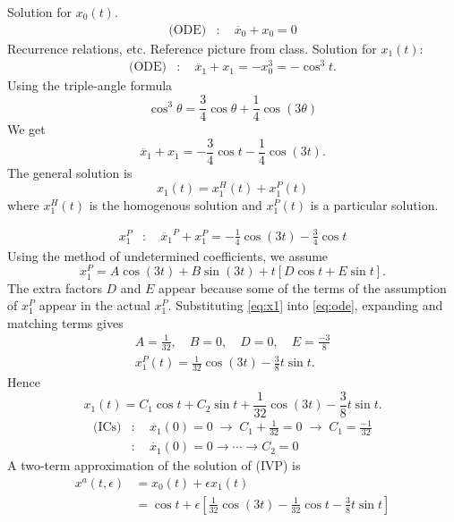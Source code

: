 \documentclass[12pt,twoside]{article}
\begin{document}
Solution for $x_0(t)$.
\begin{align*}
  \text{(ODE)} &:\quad \ddot{x_0}+x_0=0
\end{align*}
Recurrence relations, etc. Reference picture from class. Solution for $x_1(t)$:
\begin{align}
  \label{eq:ode}
  \text{(ODE)} &:\quad \ddot{x_1} + x_1 =-x_0^3=-\cos^3t.
\end{align}
Using the triple-angle formula
$$\cos^3\theta=\frac{3}{4}\cos\theta+\frac{1}{4}\cos(3\theta)$$
We get
$$\ddot{x_1}+x_1=-\frac{3}{4}\cos t-\frac{1}{4}\cos(3t).$$
The general solution is
$$x_1(t)=x_1^H(t)+x_1^P(t)$$
where $x_1^H(t)$ is the homogenous solution and $x_1^P(t)$ is a particular
solution.

\begin{align}
  \label{eq:x1}
  x_1^P &:\quad \ddot{x_1}^P +x_1^P = -\frac{1}{4}\cos(3t)-\frac{3}{4}\cos t
\end{align}
Using the method of undetermined coefficients, we assume
$$x_1^P=A\cos(3t)+B\sin(3t) + t[D\cos t + E\sin t].$$
The extra factors $D$ and $E$ appear because some of the terms of the assumption
of $x_1^P$ appear in the actual $x_1^P$. Substituting \cref{eq:x1} into
\cref{eq:ode}, expanding and matching terms gives
\begin{align*}
  A = \frac{1}{32},\quad B=0,\quad D=0,\quad E=\frac{-3}{8} \\
  x_1^P(t)=\frac{1}{32}\cos(3t)-\frac{3}{8}t\sin t.
\end{align*}
Hence
$$x_1(t)=C_1\cos t + C_2\sin t + \frac{1}{32}\cos(3t)-\frac{3}{8}t\sin t.$$
\begin{align*}
  \text{(ICs)} &:\quad x_1(0)=0\;\rightarrow\;C_1+\frac{1}{32}=0\;\rightarrow\;C_1=\frac{-1}{32} \\
             &:\quad \dot{x_1}(0)=0 \rightarrow \cdots \rightarrow C_2=0
\end{align*}
A two-term approximation of the solution of (IVP) is
\begin{align*}
  x^a(t,\epsilon)
  &= x_0(t) + \epsilon x_1(t) \\
  &= \cos t + \epsilon\left[ \frac{1}{32}\cos(3t)-\frac{1}{32}\cos t - \frac{3}{8}t\sin t \right]
\end{align*}
\end{document}
